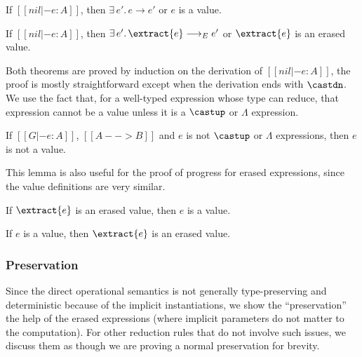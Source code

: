 \begin{theorem}[Progress]
    If $[[nil |- e : A]]$,
    then $\exists \, e'. \, e \longrightarrow e'$ or $e$ is a value.
\end{theorem}

\begin{theorem}
    If $[[nil |- e : A]]$,
    then $\exists \, e'. \, \extract{e} \longrightarrow_E e'$ or $\extract{e}$ is an erased value.
\end{theorem}

\noindent Both theorems are proved by induction on the derivation of $[[nil |- e : A]]$,
the proof is mostly straightforward except when the derivation ends with $\castdn$.
We use the fact that, for a well-typed expression whose type can reduce, that expression
cannot be a value unless it is a $\castup$ or $\Lambda$ expression.

\begin{lemma}
    If $[[G |- e : A]]$, $[[A --> B]]$ and $e$ is not $\castup$ or $\Lambda$ expressions,
    then $e$ is not a value.
\end{lemma}

This lemma is also useful for the proof of progress for erased expressions, since the
value definitions are very similar.

\begin{lemma}
    If $\extract{e}$ is an erased value, then $e$ is a value.
\end{lemma}

\begin{lemma}
    If $e$ is a value, then $\extract{e}$ is an erased value.
\end{lemma}


\subsubsection{Preservation}

Since the direct operational semantics is not generally type-preserving and
deterministic because of the implicit instantiations, we show the
``preservation'' the help of the erased expressions (where implicit parameters
do not matter to the computation). For other reduction rules that do not involve
such issues, we discuss them as though we are proving a normal preservation
for brevity.

